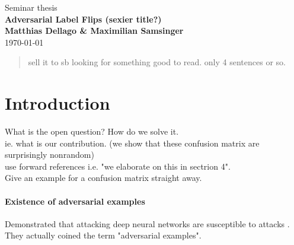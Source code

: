 \documentclass{article}
\begin{document}
\begin{titlepage}
	\noindent{}
	\vspace{3cm}
	\begin{center}
		{\Large Seminar thesis}
		\vspace{50pt}\\
		\textbf{\Huge Adversarial Label Flips (sexier title?)}
		\vspace{40pt}\\
		\textbf{\Large Matthias Dellago \& Maximilian Samsinger}\vspace{20pt}\\
		{\large\today}
		\vspace{120pt}
	\end{center}
\end{titlepage}
	
	\DeclarePairedDelimiter\abs{\lvert}{\rvert}%
	\DeclarePairedDelimiter\norm{\lVert}{\rVert}%
	\DeclarePairedDelimiter\ceil{\lceil}{\rceil}
	\DeclarePairedDelimiter\floor{\lfloor}{\rfloor}
	
\begin{abstract}
	sell it to sb looking for something good to read.
	only 4 sentences or so.
\end{abstract}

\section{Introduction}

What is the open question?
How do we solve it.
\\

ie. what is our contribution. (we show that these confusion matrix are surprisingly nonrandom)
\\
use forward references i.e. "we elaborate on this in sectrion 4".\\
Give an example for a confusion matrix straight away.
\paragraph{Existence of adversarial examples}
Demonstrated that attacking deep neural networks are susceptible to attacks \cite{Szegedy13}. They actually coined the term "adversarial examples".
\end{document}
